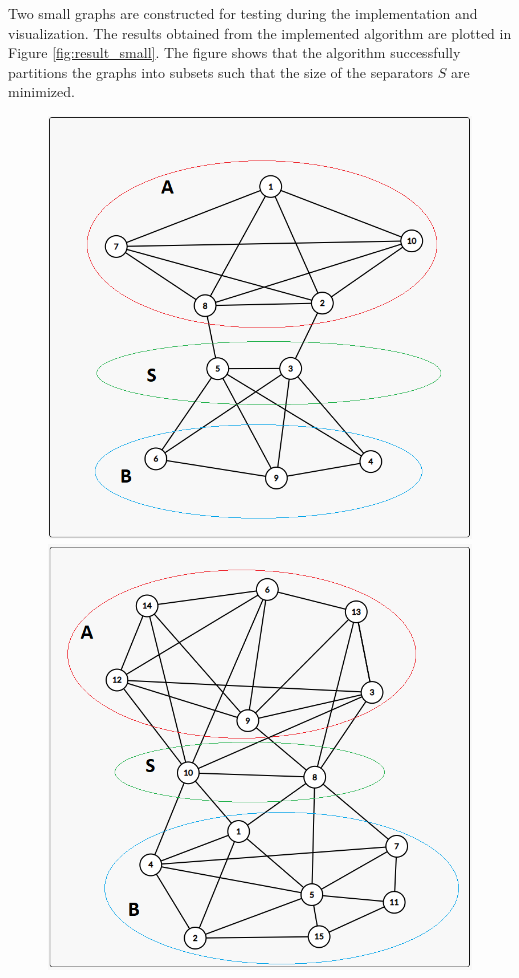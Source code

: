 \documentclass[pdftex, 12pt, a4paper]{article}
\begin{document}
Two small graphs are constructed for testing during the implementation and visualization. The results obtained from the implemented algorithm are plotted in Figure \ref{fig:result_small}. The figure shows that the algorithm successfully partitions the graphs into subsets such that the size of the separators $S$ are minimized.

\begin{figure}[t]
\begin{minipage}{0.49\textwidth}
    \centering
    \includegraphics[width=\textwidth]{figures/small_test1.PNG}
\end{minipage}
\hfil
\begin{minipage}{0.49\textwidth}
    \centering
    \includegraphics[width=\textwidth]{figures/small_test2.PNG}

\end{minipage}
\end{figure}
\end{document}
